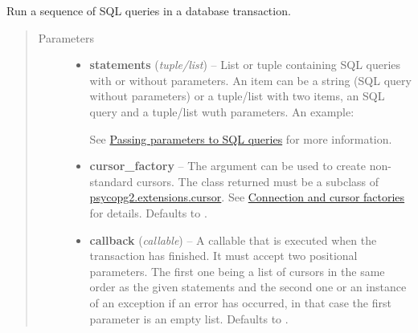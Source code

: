 \documentclass[letterpaper,10pt,english]{sphinxmanual}
\begin{document}
\begin{fulllineitems}
\begin{fulllineitems}
\begin{quote}
\begin{description}
\begin{itemize}
\end{itemize}

\end{description}\end{quote}

\end{fulllineitems}


\begin{fulllineitems}
\label{api:momoko.Connection.transaction}
Run a sequence of SQL queries in a database transaction.
\begin{quote}\begin{description}
\item[{Parameters}] \leavevmode\begin{itemize}
\item {} 
\textbf{statements} (\emph{tuple/list}) -- 
List or tuple containing SQL queries with or without parameters. An item
can be a string (SQL query without parameters) or a tuple/list with two items,
an SQL query and a tuple/list wuth parameters. An example:

See \href{http://initd.org/psycopg/docs/usage.html\#query-parameters}{Passing parameters to SQL queries} for more information.


\item {} 
\textbf{cursor\_factory} -- The  argument can be used to create non-standard cursors.
The class returned must be a subclass of \href{http://initd.org/psycopg/docs/extensions.html\#psycopg2.extensions.cursor}{psycopg2.extensions.cursor}.
See \href{http://initd.org/psycopg/docs/advanced.html\#subclassing-cursor}{Connection and cursor factories} for details. Defaults to .

\item {} 
\textbf{callback} (\emph{callable}) -- A callable that is executed when the transaction has finished. It must accept
two positional parameters. The first one being a list of cursors in the same
order as the given statements and the second one  or an instance of
an exception if an error has occurred, in that case the first parameter is
an empty list. Defaults to .

\end{itemize}

\end{description}\end{quote}

\end{fulllineitems}


\end{fulllineitems}
\end{document}
